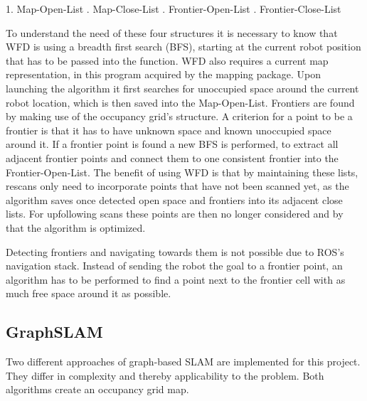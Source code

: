 \documentclass{ba-kecs}
\begin{document}
1. Map-Open-List
. Map-Close-List
. Frontier-Open-List
. Frontier-Close-List 
\newline
 
To understand the need of these four structures it is necessary to know that WFD is using a breadth first search (BFS), starting at the current robot position that has to be passed into the function. WFD also requires a current map representation, in this program acquired by the mapping package.
 Upon launching the algorithm it first searches for unoccupied space around the current robot location, which is then saved into the Map-Open-List. 
 Frontiers are found by making use of the occupancy grid's structure. A criterion for a point to be a frontier is that it has to have unknown space and known unoccupied space around it. If a frontier point is found a new BFS is performed, to extract all adjacent frontier points and connect them to one consistent frontier into the Frontier-Open-List.
 The benefit of using WFD is that by maintaining these lists, rescans only need to incorporate points that have not been scanned yet, as the algorithm saves once detected open space and frontiers into its adjacent close lists. For upfollowing scans these points are then no longer considered and by that the algorithm is optimized.
 
 Detecting frontiers and navigating towards them is not possible due to ROS's navigation stack. Instead of sending the robot the goal to a frontier point, an algorithm has to be performed to find a point next to the frontier cell with as much free space around it as possible. 
\subsection{GraphSLAM}
Two different approaches of graph-based SLAM are implemented for this project. They differ in complexity and thereby applicability to the problem. Both algorithms create an occupancy grid map. 
\end{document}
